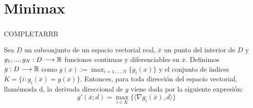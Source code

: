 \chapter{Minimax}
		\newcommand{\barx}{\bar{x} }
		\newcommand{\dd}{\textbf{\emph{d}}}
	\paragraph{}COMPLETARRR 

	\begin{proposicionBox}\label{dirDeriv}
		Sea $ D $ un subconjunto de un espacio vectorial real, $ \barx $ un punto del interior de $ D $ y $ g_1, ..., g_N : D \longrightarrow \mathbb{R} $ funciones continuas y diferenciables en $ \barx $. Definimos $ g:D \longrightarrow \mathbb{R} $ como $ g(x):=\max_{i=1,...,N}\{g_i(x)\} $ y el conjunto de índices $ K = \lbrace  i : g_i(\barx) =  g(\barx) \rbrace $. Entonces, para toda dirección del espacio vectorial, llamémosla d, la derivada direccional de $ g $ viene dada por la siguiente expresión:
		\begin{equation}
			g'(\barx;d) = \max_{i \in K}\{ \langle \nabla g_i(\barx), d \rangle\}
		\end{equation}
	\end{proposicionBox}
